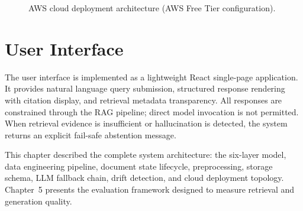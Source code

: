 \begin{figure}[H]
{%
}
\caption{AWS cloud deployment architecture (AWS Free Tier configuration).}
\label{fig:aws_deploy}
\end{figure}

\section{User Interface}
\label{sec:ui}

The user interface is implemented as a lightweight React single-page application. It provides natural language query submission, structured response rendering with citation display, and retrieval metadata transparency. All responses are constrained through the RAG pipeline; direct model invocation is not permitted. When retrieval evidence is insufficient or hallucination is detected, the system returns an explicit fail-safe abstention message.

\medskip
\noindent This chapter described the complete system architecture: the six-layer model, data engineering pipeline, document state lifecycle, preprocessing, storage schema, LLM fallback chain, drift detection, and cloud deployment topology. Chapter~5 presents the evaluation framework designed to measure retrieval and generation quality.
